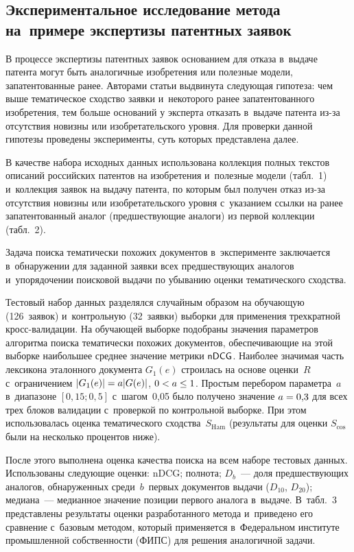 \begin{multicols}{2}
\section{Экспериментальное исследование метода на~примере 
экспертизы патентных заявок} 
  
  В процессе экспертизы патентных заявок основанием для отказа в~выдаче 
патента могут быть аналогичные изобретения или полезные модели, 
запатентованные ранее. Авторами статьи выдвинута следующая гипотеза: чем 
выше тематическое сходство заявки и~некоторого ранее запатентованного 
изобретения, тем больше оснований у эксперта отказать в~выдаче патента из-за 
отсутствия новизны или изобретательского уровня. Для проверки данной 
гипотезы проведены эксперименты, суть которых представлена далее.
  
  В качестве набора исходных данных использована коллекция полных текстов 
описаний российских патентов на изобретения и~полезные модели (табл.~1) 
и~коллекция заявок на выдачу патента, по которым был получен отказ из-за 
отсутствия новизны или изобретательского уровня с~указанием ссылки на ранее 
запатентованный аналог (пред\-шест\-ву\-ющие аналоги) из первой коллекции 
(табл.~2). 


    
  Задача поиска тематически похожих документов в~эксперименте заключается в~обнаружении для заданной заявки всех предшествующих аналогов 
и~упорядочении поисковой выдачи по убыванию оценки тематического 
сходства.
  
  Тестовый набор данных разделялся случайным образом на обучающую 
(126~заявок) и~контрольную (32~заявки) выборки для применения трехкратной 
кросс-ва\-ли\-да\-ции. На обучающей выборке по\-до\-бра\-ны значения параметров 
алгоритма поиска тематически похожих документов, обеспечивающие на этой 
выборке наибольшее среднее значение мет\-ри\-ки ${\sf nDCG}$. Наиболее 
значимая часть лексикона эталонного документа $G_1(e)$ строилась на основе 
оценки~$R$ с~ограничением $\vert G_1(e)\vert \hm= a\vert G(e)\vert$, $0\hm< 
a\hm\leq 1$. Простым перебором параметра~$a$ в~диапазоне $[0{,}15; 0{,}5]$ 
с~шагом~0,05 было получено значение $a\hm=0{,}3$ для всех трех блоков 
валидации с~проверкой по контрольной выборке. При этом использовалась 
оценка тематического сходства~$S_{\mathrm{Ham}}$ (результаты для оценки $S_{\mathrm{cos}}$ 
были на несколько процентов ниже).
  
  После этого выполнена оценка качества поиска на всем наборе тестовых 
данных. Использованы следующие оценки: {\sf nDCG}; полнота; $D_b$~--- 
доля предшествующих аналогов, обнаруженных\linebreak
 среди~$b$~первых документов 
выдачи ($D_{10}$, $D_{20}$); медиана~--- медианное значение позиции 
первого аналога в~выдаче. В~табл.~3 представлены результаты оценки 
разработанного метода и~приведено его сравнение с~базовым методом, который 
применяется в~Федеральном институте промышленной соб\-ст\-вен\-ности
(ФИПС) для решения аналогичной задачи.



\end{multicols}
